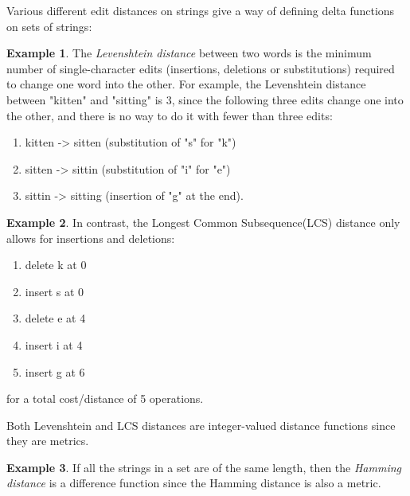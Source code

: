 \documentclass[acmsmall,review,anonymous]{acmart}\settopmatter{printfolios=true,printccs=false,printacmref=false}
\theoremstyle{definition}
\newtheorem{example}{Example}
\begin{document}
Various different edit distances on strings give a way of defining delta
functions on sets of strings:
\begin{example}
The {\em Levenshtein distance} between two words is the minimum number of
single-character edits (insertions, deletions or substitutions) required to
change one word into the other. For example, the Levenshtein distance between
"kitten" and "sitting" is 3, since the following three edits change one into
the other, and there is no way to do it with fewer than three edits:

\begin{enumerate}
  \item
  kitten -> sitten (substitution of "s" for "k")
  \item
  sitten -> sittin (substitution of "i" for "e")
  \item
  sittin -> sitting (insertion of "g" at the end).
\end{enumerate}
\end{example}
\begin{example}
In contrast, the Longest Common Subsequence(LCS) distance only allows for
insertions and deletions:
\begin{enumerate}
  \item
  delete k at 0
  \item
  insert s at 0
  \item
  delete e at 4
  \item
  insert i at 4
  \item
  insert g at 6
\end{enumerate}
for a total cost/distance of 5 operations.
\end{example}
Both Levenshtein and LCS distances are integer-valued distance functions since
they are metrics.
\begin{example}
If all the strings in a set are of the same length, then the {\em Hamming
distance} is a difference function since the Hamming distance is also a metric.
\end{example}
\end{document}
